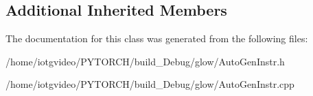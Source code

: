 \subsection*{Additional Inherited Members}


The documentation for this class was generated from the following files\+:\begin{DoxyCompactItemize}
\item 
/home/iotgvideo/\+P\+Y\+T\+O\+R\+C\+H/build\+\_\+\+Debug/glow/Auto\+Gen\+Instr.\+h\item 
/home/iotgvideo/\+P\+Y\+T\+O\+R\+C\+H/build\+\_\+\+Debug/glow/Auto\+Gen\+Instr.\+cpp\end{DoxyCompactItemize}
